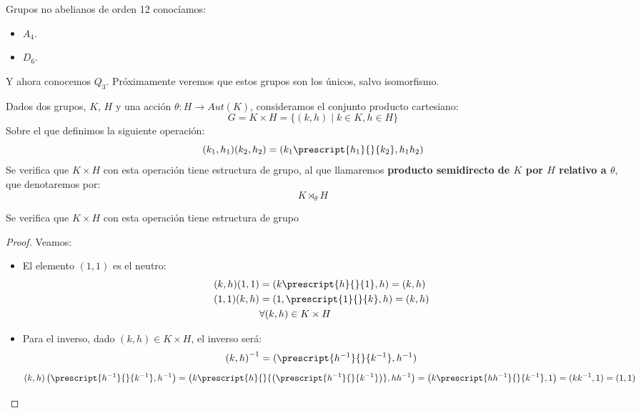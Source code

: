 \begin{ejemplo}
    Grupos no abelianos de orden 12 conocíamos:
    \begin{itemize}
        \item $A_4$.
        \item $D_6$.
    \end{itemize}
    Y ahora conocemos $Q_3$. Próximamente veremos que estos grupos son los únicos, salvo isomorfismo.
\end{ejemplo}

\begin{definicion}
    Dados dos grupos, $K$, $H$ y una acción $\theta: H \to Aut(K)$, consideramos el conjunto producto cartesiano:
    \begin{equation*}
        G = K\times H = \{(k,h)\mid k\in K, h\in H\}
    \end{equation*}
    Sobre el que definimos la siguiente operación:
    \begin{equation*}
        (k_1,h_1)(k_2,h_2) = (k_1 \prescript{h_1}{}{k_2}, h_1h_2)
    \end{equation*}
    Se verifica que $K\times H$ con esta operación tiene estructura de grupo, al que llamaremos \textbf{producto semidirecto de $K$ por $H$ relativo a $\theta$}, que denotaremos por:
    \begin{equation*}
        K \rtimes_\theta H
    \end{equation*}
\end{definicion}

\begin{teo}
    Se verifica que $K\times H$ con esta operación tiene estructura de grupo
    \begin{proof} %
        Veamos:
        \begin{itemize}
            \item El elemento $(1,1)$ es el neutro:
                \begin{align*}
                    (k,h)(1,1) &= (k\prescript{h}{}{1},h) = (k,h) \\
                    (1,1)(k,h) &= (1, \prescript{1}{}{k},h) = (k,h) \\
                               &\forall (k,h)\in K\times H
                \end{align*}
            \item Para el inverso, dado $(k,h)\in K\times H$, el inverso será:
                \begin{equation*}
                    {(k,h)}^{-1} = (\prescript{h^{-1}}{}{k^{-1}},h^{-1})
                \end{equation*}
                \begin{equation*}
                    (k,h)\left(\prescript{h^{-1}}{}{k^{-1}},h^{-1}\right) = \left(k\prescript{h}{}{\left(\prescript{h^{-1}}{}{k^{-1}}\right)}, hh^{-1}\right) = \left(k\prescript{hh^{-1}}{}{k^{-1}}, 1\right) = (kk^{-1},1) = (1,1)
                \end{equation*}
        \end{itemize}
    \end{proof}
\end{teo}

